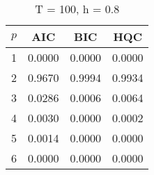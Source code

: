\begin{table}[ht]
\captionsetup{justification=raggedright,singlelinecheck=false}
\caption*{T = 100, h = 0.8}
\begin{tabular}{c|ccc}
  $p$ & AIC & BIC & HQC \\\hline
  1 & 0.0000 & 0.0000 & 0.0000 \\
  2 & 0.9670 & 0.9994 & 0.9934 \\
  3 & 0.0286 & 0.0006 & 0.0064 \\
  4 & 0.0030 & 0.0000 & 0.0002 \\
  5 & 0.0014 & 0.0000 & 0.0000 \\
  6 & 0.0000 & 0.0000 & 0.0000 \\
\end{tabular}
\end{table}
